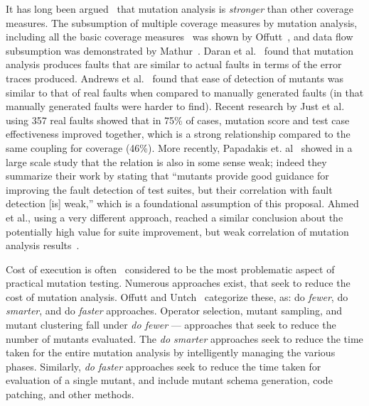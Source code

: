It has long been argued~\cite{budd1980mutation} that mutation analysis is \emph{stronger}
than other coverage measures. The subsumption of multiple coverage
measures by mutation analysis, including all the basic coverage measures~\cite{myer1979art}
was shown by Offutt~\cite{offutt1996subsumption}, and data flow
subsumption was demonstrated by Mathur~\cite{mathur1994empirical}.
Daran et al.~\cite{daran1996software} found that mutation analysis produces
faults that are similar to actual faults in terms of the error traces produced. Andrews et
al.~\cite{andrews2005mutation,andrews2006using} found that ease of detection
of mutants was similar to that of real faults when compared to manually
generated faults (in that manually generated faults were harder to find).
Recent research by Just et al.~\cite{just2014mutants} using 357 real faults
showed that in 75\% of cases, mutation score and test case
effectiveness improved together, which is a strong relationship
compared to the same coupling for coverage (46\%).  More recently,
Papadakis et. al~\cite{papadakis2018mutation} showed in a large scale study that the relation is also in some sense weak; indeed
they summarize their work by stating that ``mutants provide good guidance for improving the
fault detection of test suites, but their correlation with fault
detection [is] weak,'' which is a foundational assumption of this
proposal.  Ahmed et al., using a very different approach, reached a similar
conclusion about the potentially high value for suite improvement, but weak correlation of mutation
analysis results~\cite{ahmed_testedness}.

Cost of execution is often~\cite{jia2011analysis} considered 
to be the most problematic aspect of practical mutation testing.
Numerous approaches exist, that seek to reduce the cost of mutation
analysis. Offutt and Untch~\cite{offutt2001mutation} categorize these,
as: do \textit{fewer}, do \textit{smarter}, and do \textit{faster} approaches.
Operator selection, mutant sampling, and mutant clustering fall under
\textit{do fewer} --- approaches that seek to reduce the number of mutants
evaluated.  The \emph{do smarter} approaches seek to reduce the time taken
for the entire mutation analysis by intelligently managing the various phases.
Similarly, \textit{do faster} approaches seek to
reduce the time taken for evaluation of a single mutant, and include
mutant schema generation, code patching, and other methods.


